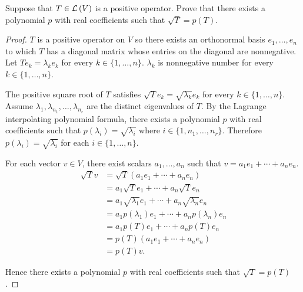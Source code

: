 \begin{exercise}\label{chapter7:sectionC:exercise17}
    Suppose that $T \in \mathcal{L}\left({V}\right)$ is a positive operator. Prove that there exists a polynomial $p$ with real coefficients such that $\sqrt{T} = p(T)$.
\end{exercise}

\begin{proof}
    $T$ is a positive operator on $V$ so there exists an orthonormal basis $e_{1}, \ldots, e_{n}$ to which $T$ has a diagonal matrix whose entries on the diagonal are nonnegative. Let $Te_{k} = \lambda_{k}e_{k}$ for every $k\in\{1,\ldots,n\}$. $\lambda_{k}$ is nonnegative number for every $k\in\{1,\ldots,n\}$.

    The positive square root of $T$ satisfies $\sqrt{T}e_{k} = \sqrt{\lambda_{k}}e_{k}$ for every $k\in\{1,\ldots,n\}$. Assume $\lambda_{1}, \lambda_{n_{1}}, \ldots, \lambda_{n_{r}}$ are the distinct eigenvalues of $T$. By the Lagrange interpolating polynomial formula, there exists a polynomial $p$ with real coefficients such that $p(\lambda_{i}) = \sqrt{\lambda_{i}}$ where $i\in\{1, n_{1}, \ldots, n_{r}\}$. Therefore $p(\lambda_{i}) = \sqrt{\lambda_{i}}$ for each $i\in\{1,\ldots,n\}$.

    For each vector $v\in V$, there exist scalars $a_{1}, \ldots, a_{n}$ such that $v = a_{1}e_{1} + \cdots + a_{n}e_{n}$.
    \begin{align*}
        \sqrt{T}v & = \sqrt{T}(a_{1}e_{1} + \cdots + a_{n}e_{n})                           \\
                  & = a_{1}\sqrt{T}e_{1} + \cdots + a_{n}\sqrt{T}e_{n}                     \\
                  & = a_{1}\sqrt{\lambda_{1}}e_{1} + \cdots + a_{n}\sqrt{\lambda_{n}}e_{n} \\
                  & = a_{1}p(\lambda_{1})e_{1} + \cdots + a_{n}p(\lambda_{n})e_{n}         \\
                  & = a_{1}p(T)e_{1} + \cdots + a_{n}p(T)e_{n}                             \\
                  & = p(T)(a_{1}e_{1} + \cdots + a_{n}e_{n})                               \\
                  & = p(T)v.
    \end{align*}

    Hence there exists a polynomial $p$ with real coefficients such that $\sqrt{T} = p(T)$.
\end{proof}
\newpage

